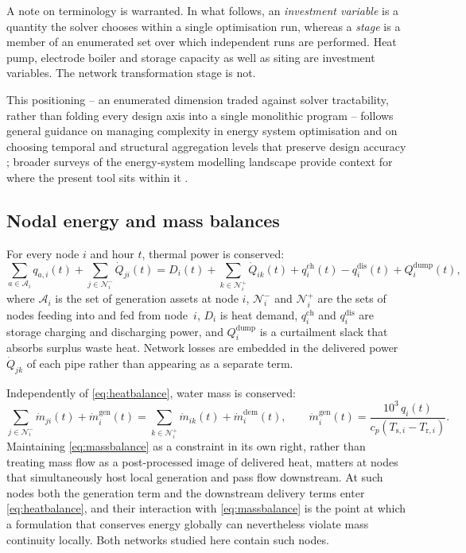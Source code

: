\documentclass[review,3p]{elsarticle}
\begin{document}
A note on terminology is warranted. In what follows, an
\emph{investment variable} is a quantity the solver chooses within a
single optimisation run, whereas a \emph{stage} is a member of an
enumerated set over which independent runs are performed. Heat pump,
electrode boiler and storage capacity as well as siting are investment
variables. The network transformation stage is not.

This positioning -- an enumerated dimension traded against solver
tractability, rather than folding every design axis into a single
monolithic program -- follows general guidance on managing complexity in
energy system optimisation \cite{Kotzur.2021} and on choosing temporal
and structural aggregation levels that preserve design accuracy
\cite{Hoffmann.2022}; broader surveys of the energy-system modelling
landscape provide context for where the present tool sits within it
\cite{Hoffner.2024}.

\subsection{Nodal energy and mass balances}
\label{sec:model:balances}

For every node $i$ and hour $t$, thermal power is conserved:
\begin{equation}
\label{eq:heatbalance}
\sum_{a \in \mathcal{A}_i} q_{a,i}(t) + \sum_{j \in \mathcal{N}_i^{-}} \dot{Q}_{ji}(t)
= D_i(t) + \sum_{k \in \mathcal{N}_i^{+}} \dot{Q}_{ik}(t)
+ q_i^{\mathrm{ch}}(t) - q_i^{\mathrm{dis}}(t) + Q_i^{\mathrm{dump}}(t),
\end{equation}
where $\mathcal{A}_i$ is the set of generation assets at node $i$,
$\mathcal{N}_i^{-}$ and $\mathcal{N}_i^{+}$ are the sets of nodes
feeding into and fed from node~$i$, $D_i$ is heat demand,
$q_i^{\mathrm{ch}}$ and $q_i^{\mathrm{dis}}$ are storage charging and
discharging power, and $Q_i^{\mathrm{dump}}$ is a curtailment slack that
absorbs surplus waste heat. Network losses are embedded in the delivered
power $\dot{Q}_{jk}$ of each pipe rather than appearing as a separate
term.

Independently of \cref{eq:heatbalance}, water mass is conserved:
\begin{equation}
\label{eq:massbalance}
\sum_{j \in \mathcal{N}_i^{-}} \dot{m}_{ji}(t) + \dot{m}_i^{\mathrm{gen}}(t)
= \sum_{k \in \mathcal{N}_i^{+}} \dot{m}_{ik}(t) + \dot{m}_i^{\mathrm{dem}}(t),
\qquad
\dot{m}_i^{\mathrm{gen}}(t) = \frac{10^{3}\, q_i(t)}{c_p \left(T_{\mathrm{s},i} - T_{\mathrm{r},i}\right)} .
\end{equation}
Maintaining \cref{eq:massbalance} as a constraint in its own right,
rather than treating mass flow as a post-processed image of delivered
heat, matters at nodes that simultaneously host local generation and
pass flow downstream. At such nodes both the generation term and the
downstream delivery terms enter \cref{eq:heatbalance}, and their
interaction with \cref{eq:massbalance} is the point at which a
formulation that conserves energy globally can nevertheless violate mass
continuity locally. Both networks studied here contain such nodes.
\end{document}
